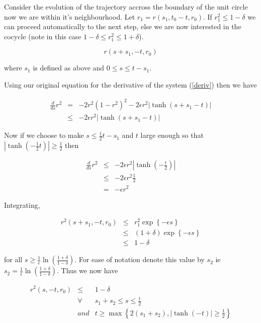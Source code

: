 Consider the evolution of the trajectory accross the boundary of the unit circle now we are within it's neighbourhood. Let $r_{1} = r(s_{1},t_{0}-t,r_{0})$. If $r_{1}^2 \leq 1 - \delta$ we can proceed automatically to the next step, else
we are now interested in the cocycle (note in this case $1 - \delta \leq r_{1}^2 \leq 1 + \delta$).

\begin{equation}
  r(s+s_{1},-t,r_{0})
\end{equation}

where $s_{1}$ is defined as above and $0 \leq s \leq t-s_{1}$.

Using our original equation for the derivative of the system (\ref{deriv}) then we have

\begin{eqnarray*}
  \frac{d}{ds} r^2 & = & - 2r^2(1-r^2)^2 - 2 \epsilon r^2 |\tanh (s+s_{1}-t)| \\
  & \leq & - 2 \epsilon r^2 |\tanh (s+s_{1}-t)|
\end{eqnarray*}

Now if we choose to make $s \leq \frac{1}{2}t - s_1$ and $t$ large enough so that $|\tanh (-\frac{1}{2}t)| \geq \frac{1}{2}$ then

\begin{eqnarray*}
  \frac{d}{ds} r^2 & \leq & - 2 \epsilon r^2 |\tanh (-\frac{t}{2})| \\
  & \leq & - 2 \epsilon r^2 \frac{1}{2} \\
  & = & -  \epsilon r^2
\end{eqnarray*}

Integrating,

\begin{eqnarray*}
  r^{2}(s+s_{1},-t,r_0) & \leq & r_1^{2}\exp\left\{- \epsilon s \right\} \\
  & \leq & (1+\delta) \exp\left\{- \epsilon s \right\} \\
  & \leq & 1 - \delta
\end{eqnarray*}

for all $s \geq \frac{1}{\epsilon}\ln(\frac{1+\delta}{1-\delta})$. For ease of notation denote this value by $s_2$ ie $s_2 = \frac{1}{\epsilon} \ln(\frac{1+\delta}{1-\delta})$. Thus we now have

\begin{eqnarray*}
  r^2(s,-t,r_{0}) & \leq & 1 - \delta \\
  & \forall & s_{1}+s_2 \leq s \leq \frac{t}{2} \\
  & and & t \geq \max \left\{2(s_1+s_2),|\tanh (-t)| \geq \frac{1}{2} \right\}
\end{eqnarray*}

